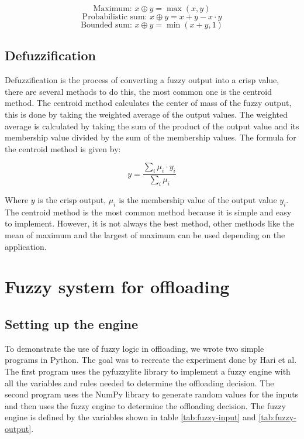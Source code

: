 \begin{minipage}{0.9624\textwidth}
	\begin{equation}
		\text{Maximum: } x \oplus y = \max(x, y)
	\end{equation}
	\begin{equation}
		\text{Probabilistic sum: } x \oplus y = x + y - x \cdot y
	\end{equation}
	\begin{equation}
		\text{Bounded sum: } x \oplus y = \min(x + y, 1)
	\end{equation}
\end{minipage}

\subsection{Defuzzification}
\label{subsec:fuzzy-defuzzification}

Defuzzification is the process of converting a fuzzy output into a crisp value, there are several methods to do this,
the most common one is the centroid method. The centroid method calculates the center of mass of the fuzzy output, this
is done by taking the weighted average of the output values. The weighted average is calculated by taking the sum of
the product of the output value and its membership value divided by the sum of the membership values. The formula for
the centroid method is given by:

\begin{equation}
	y = \frac{\sum_{i} \mu_i \cdot y_i}{\sum_{i} \mu_i}
\end{equation}

Where $y$ is the crisp output, $\mu_i$ is the membership value of the output value $y_i$. The centroid method is the
most common method because it is simple and easy to implement. However, it is not always the best method, other methods
like the mean of maximum and the largest of maximum can be used depending on the application.

\section{Fuzzy system for offloading}
\label{sec:fuzzy-offloading}

\subsection{Setting up the engine}
\label{subsec:fuzzy-setup}

To demonstrate the use of fuzzy logic in offloading, we wrote two simple programs in Python. The goal was to recreate
the experiment done by Hari et al.\cite{Hari-et-al-2018} The first program uses the pyfuzzylite\cite{fuzzylite} library
to implement a fuzzy engine with all the variables and rules needed to determine the offloading decision. The second
program uses the NumPy library to generate random values for the inputs and then uses the fuzzy engine to determine
the offloading decision. The fuzzy engine is defined by the variables shown in table \ref{tab:fuzzy-input} and
\ref{tab:fuzzy-output}.

